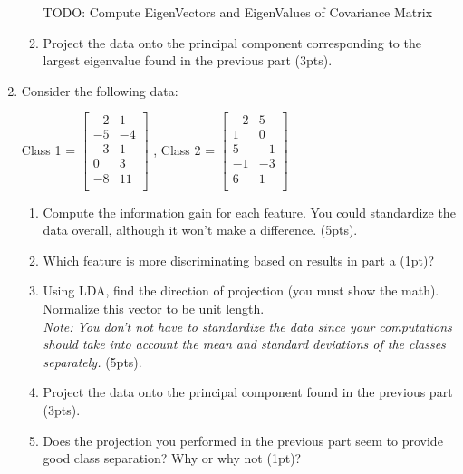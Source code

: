\documentclass[12pt]{article}
\begin{document}
\begin{enumerate}
\begin{enumerate}
TODO: Compute EigenVectors and EigenValues of Covariance Matrix


\newpage
	\item Project the data onto the principal component corresponding to the largest eigenvalue found in the previous part (3pts).
	\end{enumerate}

\newpage
\item Consider the following data:\\
\begin{center}
Class 1 = 
$
 \begin{bmatrix}
	-2 & 1\\
	-5 & -4\\	
	-3 & 1\\
	0 & 3\\
	-8 & 11\\
	
\end{bmatrix}
$
, Class 2 = 
$
 \begin{bmatrix}
	-2 & 5\\
	1 & 0\\
	5 & -1\\
	-1 & -3\\
	6 & 1\\
\end{bmatrix}
$
\end{center}
	\begin{enumerate}
	\item Compute the information gain for each feature.  You could standardize the data overall, although it won't make a difference. (5pts).
\newpage
	\item Which feature is more discriminating based on results in part a (1pt)?
\newpage
	\item Using LDA, find the direction of projection (you must show the math).  Normalize this vector to be unit length.\\ \emph{Note: You don't not have to standardize the data since your computations should take into account the mean and standard deviations of the classes separately.}  (5pts).
\newpage
	\item Project the data onto the principal component found in the previous part (3pts).
\newpage
	\item Does the projection you performed in the previous part seem to provide good class separation?  Why or why not (1pt)?
	\end{enumerate}
\end{enumerate}
\end{document}
